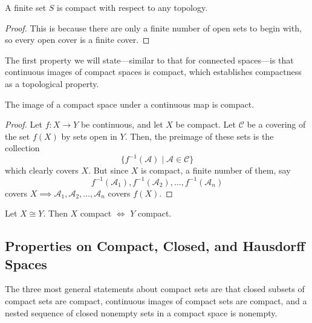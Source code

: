   \begin{lemma}
    A finite set $S$ is compact with respect to any topology. 
  \end{lemma}
  \begin{proof}
    This is because there are only a finite number of open sets to begin with, so every open cover is a finite cover. 
  \end{proof}

  The first property we will state---similar to that for connected spaces---is that continuous images of compact spaces is compact, which establishes compactness as a topological property. 

  \begin{theorem}
    The image of a compact space under a continuous map is compact.
  \end{theorem}
  \begin{proof}
    Let $f: X \rightarrow Y$ be continuous, and let $X$ be compact. Let $\mathcal{C}$ be a covering of the set $f(X)$ by sets open in $Y$. Then, the preimage of these sets is the collection
    \begin{equation}
      \{f^{-1}(\mathcal{A}) \; | \; \mathcal{A} \in \mathcal{C}\}
    \end{equation}
    which clearly covers $X$. But since $X$ is compact, a finite number of them, say
    \begin{equation}
      f^{-1} (\mathcal{A}_1), f^{-1} (\mathcal{A}_2), \ldots , f^{-1} (\mathcal{A}_n)
    \end{equation}
    covers $X \implies \mathcal{A}_1, \mathcal{A}_2, \ldots, \mathcal{A}_n$ covers $f(X)$. 
  \end{proof}

  \begin{corollary}
    Let $X \cong Y$. Then $X$ compact $\iff$ $Y$ compact. 
  \end{corollary}

\subsection{Properties on Compact, Closed, and Hausdorff Spaces}

  The three most general statements about compact sets are that closed subsets of compact sets are compact, continuous images of compact sets are compact, and a nested sequence of closed nonempty sets in a compact space is nonempty. 

